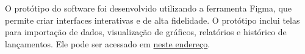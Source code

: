 
\begin{samepage}

O protótipo do software foi desenvolvido utilizando a ferramenta Figma, que permite criar interfaces interativas e de alta fidelidade. O protótipo inclui telas para importação de dados, visualização de gráficos, relatórios e histórico de lançamentos. Ele pode ser acessado em \href{https://www.figma.com/proto/hpceGFGo6mcwMjRJsKIyG7/Foguete-D-agua?node-id=19-2848&p=f&t=BINV4uEIBSLAGqsi-1&scaling=min-zoom&content-scaling=fixed&page-id=0%3A1&starting-point-node-id=19%3A2848}{neste endereço}.

\end{samepage}


